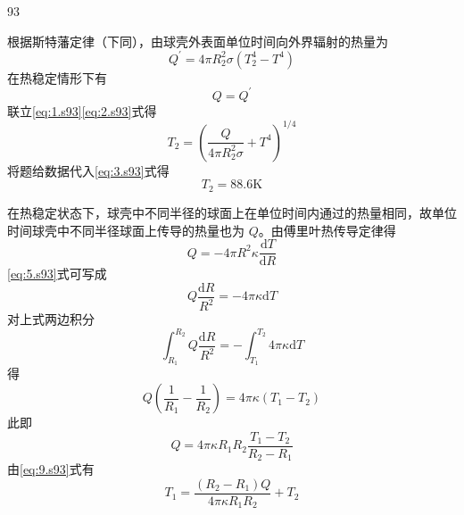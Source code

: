 \begin{solution}{93}
\begin{subsolution}
根据斯特藩定律（下同），由球壳外表面单位时间向外界辐射的热量为
\begin{equation}
Q ^ {\prime} = 4 \pi R _ {2} ^ {2} \sigma \left(T _ {2} ^ {4} - T ^ {4}\right)
\label{eq:1.s93}
\end{equation}
在热稳定情形下有
\begin{equation}
Q = Q ^ {\prime}
\label{eq:2.s93}
\end{equation}
联立\eqref{eq:1.s93}\eqref{eq:2.s93}式得
\begin{equation}
T _ {2} = \left(\frac {Q}{4 \pi R _ {2} ^ {2} \sigma} + T ^ {4}\right) ^ {1 / 4}
\label{eq:3.s93}
\end{equation}
将题给数据代入\eqref{eq:3.s93}式得
\begin{equation}
T _ {2} = 8 8. 6 \mathrm{K}
\label{eq:4.s93}
\end{equation}
\end{subsolution}
\begin{subsolution}
在热稳定状态下，球壳中不同半径的球面上在单位时间内通过的热量相同，故单位时间球壳中不同半径球面上传导的热量也为 $Q$。由傅里叶热传导定律得
\begin{equation}
Q = - 4 \pi R ^ {2} \kappa \frac {\mathrm{d} T}{\mathrm{d} R}
\label{eq:5.s93}
\end{equation}
\eqref{eq:5.s93}式可写成
\begin{equation}
Q \frac {\mathrm{d} R}{R ^ {2}} = - 4 \pi \kappa \mathrm{d} T
\label{eq:6.s93}
\end{equation}
对上式两边积分
\begin{equation}
\int_ {R _ {1}} ^ {R _ {2}} Q \frac {\mathrm{d} R}{R ^ {2}} = - \int_ {T _ {1}} ^ {T _ {2}} 4 \pi \kappa \mathrm{d} T
\label{eq:7.s93}
\end{equation}
得
\begin{equation}
Q \left(\frac {1}{R _ {1}} - \frac {1}{R _ {2}}\right) = 4 \pi \kappa (T _ {1} - T _ {2})
\label{eq:8.s93}
\end{equation}
此即
\begin{equation}
Q = 4 \pi \kappa R _ {1} R _ {2} \frac {T _ {1} - T _ {2}}{R _ {2} - R _ {1}}
\label{eq:9.s93}
\end{equation}
由\eqref{eq:9.s93}式有
\begin{equation}
T _ {1} = \frac {\left(R _ {2} - R _ {1}\right) Q}{4 \pi \kappa R _ {1} R _ {2}} + T _ {2}
\label{eq:10.s93}
\end{equation}

\end{subsolution}
\end{solution}
